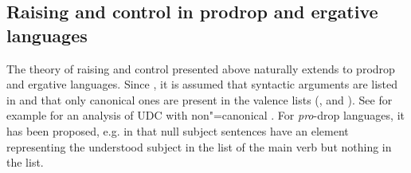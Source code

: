 


\subsection{Raising and control in prodrop and ergative languages}

The theory of raising and control presented above naturally extends to prodrop and ergative
languages.  Since \citet*{BMS2001a}, it is assumed that syntactic arguments are listed in \argst and
that only canonical ones are present in the valence lists (\subj, \spr and \comps). See for example
 for an analysis of UDC with non"=canonical . For \emph{pro}-drop languages,
it has been proposed, e.g. in \citep[]{ManningandSag1998} that null subject sentences have
an element representing the understood subject in the \argst list of the main verb but nothing in
the \subj list.

